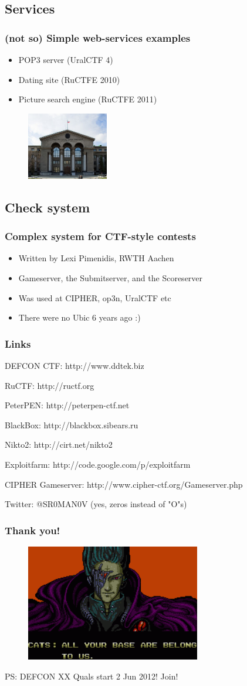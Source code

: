 \documentclass{beamer}
\begin{document}
\subsection{Services}
\frame
{
\frametitle{(not so) Simple web-services examples}
\begin{itemize}
\item POP3 server (UralCTF 4)
\item Dating site (RuCTFE 2010)
\item Picture search engine (RuCTFE 2011)
\end{itemize}
\linebreak

\pause
{}
\begin{figure}
\includegraphics[width=1.4in,height=1.2	in]{pics/usu.jpg}
\end{figure}
}

\subsection{Check system}
\frame
{
\frametitle{Complex system for CTF-style contests}
\begin{itemize}
\item<1-> Written by Lexi Pimenidis, RWTH Aachen
\item<1-> Gameserver, the Submitserver, and the Scoreserver
\item<1-> Was used at CIPHER, op3n, UralCTF	etc
\item<2-> There were no Ubic 6 years ago :)
\end{itemize}
}

\frame
{
\frametitle{Links}
\item DEFCON CTF: http://www.ddtek.biz
\item RuCTF: http://ructf.org
\item PeterPEN: http://peterpen-ctf.net
\item BlackBox: http://blackbox.sibears.ru
\item Nikto2: http://cirt.net/nikto2
\item Exploitfarm: http://code.google.com/p/exploitfarm
\item CIPHER Gameserver: http://www.cipher-ctf.org/Gameserver.php
\item Twitter: @SR0MAN0V (yes, zeros instead of "O"s)
}

\frame
{
\frametitle{Thank you!}
\begin{figure}
\includegraphics[width=3in,height=2in]{pics/aybabtu.png}
\end{figure}

PS: DEFCON XX Quals start 2 Jun 2012! Join!
}
\end{document}
